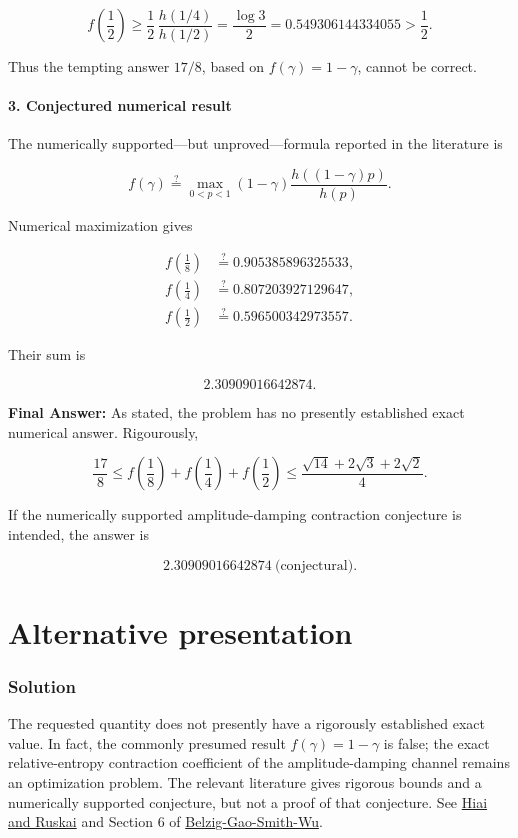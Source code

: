 \documentclass[11pt]{article}
\begin{document}
\[
f\left(\frac12\right)
\geq
\frac12\,\frac{h(1/4)}{h(1/2)}
=
\frac{\log3}{2}
=
0.549306144334055
>
\frac12.
\]

Thus the tempting answer $17/8$, based on $f(\gamma)=1-\gamma$, cannot be correct.

\paragraph*{3. Conjectured numerical result}

The numerically supported---but unproved---formula reported in the literature is

\[
f(\gamma)\stackrel{?}{=}
\max_{0<p<1}
(1-\gamma)
\frac{h((1-\gamma)p)}{h(p)}.
\]

Numerical maximization gives

\[
\begin{aligned}
f\left(\frac18\right)&\stackrel{?}{=}0.905385896325533,\\
f\left(\frac14\right)&\stackrel{?}{=}0.807203927129647,\\
f\left(\frac12\right)&\stackrel{?}{=}0.596500342973557.
\end{aligned}
\]

Their sum is

\[
2.30909016642874.
\]

\textbf{Final Answer:} As stated, the problem has no presently established exact numerical answer. Rigourously,

\[
\boxed{
\frac{17}{8}
\leq
f\left(\frac18\right)+f\left(\frac14\right)+f\left(\frac12\right)
\leq
\frac{\sqrt{14}+2\sqrt3+2\sqrt2}{4}
}.
\]

If the numerically supported amplitude-damping contraction conjecture is intended, the answer is

\[
\boxed{2.30909016642874\ \text{(conjectural)}}.
\]
\section*{Alternative presentation}
\subsubsection*{Solution}
The requested quantity does not presently have a rigorously established exact value. In fact, the commonly presumed result $f(\gamma)=1-\gamma$ is false; the exact relative-entropy contraction coefficient of the amplitude-damping channel remains an optimization problem. The relevant literature gives rigorous bounds and a numerically supported conjecture, but not a proof of that conjecture. See \href{\detokenize{https://arxiv.org/abs/1508.03551}}{Hiai and Ruskai} and Section 6 of \href{\detokenize{https://arxiv.org/abs/2411.19890}}{Belzig-Gao-Smith-Wu}.
\end{document}

